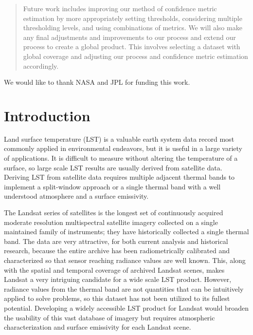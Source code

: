 \documentclass{book}
\begin{document}
\begin{abstract}
Future work includes improving our method of confidence metric estimation by more appropriately setting thresholds, considering multiple thresholding levels, and using combinations of metrics.  We will also make any final adjustments and improvements to our process and extend our process to create a global product.  This involves selecting a dataset with global coverage and adjusting our process and confidence metric estimation accordingly.

\end{abstract}

\begin{acknowledgements}
We would like to thank NASA and JPL for funding this work.
\end{acknowledgements}


\tableofcontents
\listoffigures
\listoftables

\chapter{Introduction}
\label{ch:introduction}

Land surface temperature (LST) is a valuable earth system data record most commonly applied in environmental endeavors, but it is useful in a large variety of applications.  It is difficult to measure without altering the temperature of a surface, so large scale LST results are usually derived from satellite data.  Deriving LST from satellite data requires multiple adjacent thermal bands to implement a split-window approach or a single thermal band with a well understood atmosphere and a surface emissivity.

The Landsat series of satellites is the longest set of continuously acquired moderate resolution multispectral satellite imagery collected on a single maintained family of instruments; they have historically collected a single thermal band.  The data are very attractive, for both current analysis and historical research, because the entire archive has been radiometrically calibrated and characterized so that sensor reaching radiance values are well known.  This, along with the spatial and temporal coverage of archived Landsat scenes, makes Landsat a very intriguing candidate for a wide scale LST product.  However, radiance values from the thermal band are not quantities that can be intuitively applied to solve problems, so this dataset has not been utilized to its fullest potential.  Developing a widely accessible LST product for Landsat would broaden the usability of this vast database of imagery but requires atmospheric characterization and surface emissivity for each Landsat scene.
\end{document}
